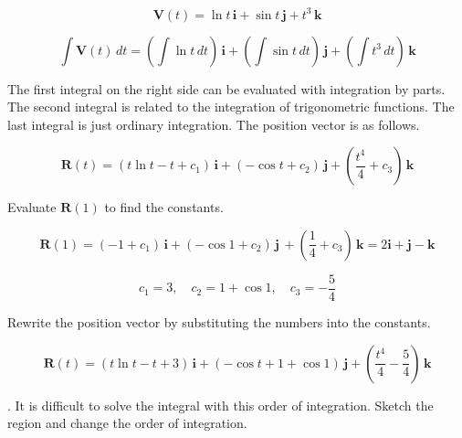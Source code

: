 \documentclass{article}
\begin{document}
\[\mathbf{V}(t)=\ln t\,\mathbf{i}+\sin t\,\mathbf{j}+t^3\,\mathbf{k}\]

\[\int\mathbf{V}(t)\,dt=\left(\int\ln t\,dt\right)\,\mathbf{i}+\left(\int\sin t\,dt\right)\,\mathbf{j}+\left(\int t^3\,dt\right)\,\mathbf{k}\]

\hfill

\noindent The first integral on the right side can be evaluated with integration by parts. The second integral is related to the integration of trigonometric functions. The last integral is just ordinary integration. The position vector is as follows.

\[\mathbf{R}(t)=(t\ln t- t+c_1)\,\mathbf{i}+(-\cos t+c_2)\,\mathbf{j}+\left(\frac{t^4}4+c_3\right)\,\mathbf{k}\]

\newpage

\noindent Evaluate $\mathbf{R}(1)$ to find the constants.

\[\mathbf{R}(1)=(-1+c_1)\,\mathbf{i}+(-\cos1+c_2)\,\mathbf{j}\,+\left(\frac14+c_3\right)\,\mathbf{k}=2\mathbf{i}+\mathbf{j}-\mathbf{k}\]

\[c_1=3,\quad c_2=1+\cos1,\quad c_3=-\frac54\]

\hfill

\noindent Rewrite the position vector by substituting the numbers into the constants.

\[\boxed{\mathbf{R}(t)=(t\ln t-t+3)\,\mathbf{i}+(-\cos t + 1 + \cos 1)\,\mathbf{j}+\left(\frac{t^4}4-\frac54\right)\,\mathbf{k}}\]

\hfill

. It is difficult to solve the integral with this order of integration. Sketch the region and change the order of integration.
\end{document}
